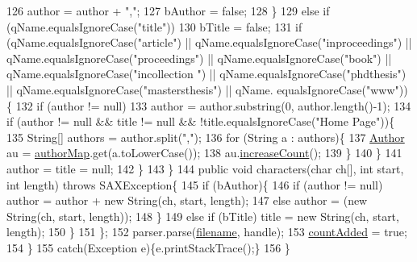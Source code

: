 \begin{DoxyCode}
126                         author = author + \textcolor{stringliteral}{","};
127                         bAuthor = \textcolor{keyword}{false};
128                     \}
129                     \textcolor{keywordflow}{else} \textcolor{keywordflow}{if} (qName.equalsIgnoreCase(\textcolor{stringliteral}{"title"}))
130                         bTitle = \textcolor{keyword}{false};
131                     \textcolor{keywordflow}{if} (qName.equalsIgnoreCase(\textcolor{stringliteral}{"article"}) || qName.equalsIgnoreCase(\textcolor{stringliteral}{"inproceedings"}) || 
      qName.equalsIgnoreCase(\textcolor{stringliteral}{"proceedings"}) || qName.equalsIgnoreCase(\textcolor{stringliteral}{"book"}) || qName.equalsIgnoreCase(\textcolor{stringliteral}{"incollection
      "}) || qName.equalsIgnoreCase(\textcolor{stringliteral}{"phdthesis"}) || qName.equalsIgnoreCase(\textcolor{stringliteral}{"mastersthesis"}) || qName.
      equalsIgnoreCase(\textcolor{stringliteral}{"www"}))\{
132                         \textcolor{keywordflow}{if} (author != null)
133                             author = author.substring(0, author.length()-1);
134                         \textcolor{keywordflow}{if} (author != null && title != null && !title.equalsIgnoreCase(\textcolor{stringliteral}{"Home Page"}))\{
135                             String[] authors = author.split(\textcolor{stringliteral}{","});
136                             \textcolor{keywordflow}{for} (String a : authors)\{
137                                 \hyperlink{classAuthor}{Author} au = \hyperlink{classAuthorManager_a0adde1702d5fc9ec68f403848dee10a6}{authorMap}.get(a.toLowerCase());
138                                 au.\hyperlink{classAuthor_ad3fce97df74d93d780a0fe81ee485e15}{increaseCount}();
139                             \}
140                         \}
141                         author = title = null;
142                     \}
143                 \}
144                 \textcolor{keyword}{public} \textcolor{keywordtype}{void} characters(\textcolor{keywordtype}{char} ch[], \textcolor{keywordtype}{int} start, \textcolor{keywordtype}{int} length) \textcolor{keywordflow}{throws} SAXException\{
145                     \textcolor{keywordflow}{if} (bAuthor)\{
146                         \textcolor{keywordflow}{if} (author != null) author = author + \textcolor{keyword}{new} String(ch, start, length);
147                         \textcolor{keywordflow}{else} author = (\textcolor{keyword}{new} String(ch, start, length));
148                     \}
149                     \textcolor{keywordflow}{else} \textcolor{keywordflow}{if} (bTitle) title = \textcolor{keyword}{new} String(ch, start, length);
150                 \}
151             \};
152             parser.parse(\hyperlink{classAuthorManager_ab51e8e8b1326d63e88c21d56a9ea631a}{filename}, handle);
153             \hyperlink{classAuthorManager_a5d91f1fb549ce31ad9cfcb2d6fc38817}{countAdded} = \textcolor{keyword}{true};
154         \}
155         \textcolor{keywordflow}{catch}(Exception e)\{e.printStackTrace();\}
156     \}
\end{DoxyCode}
